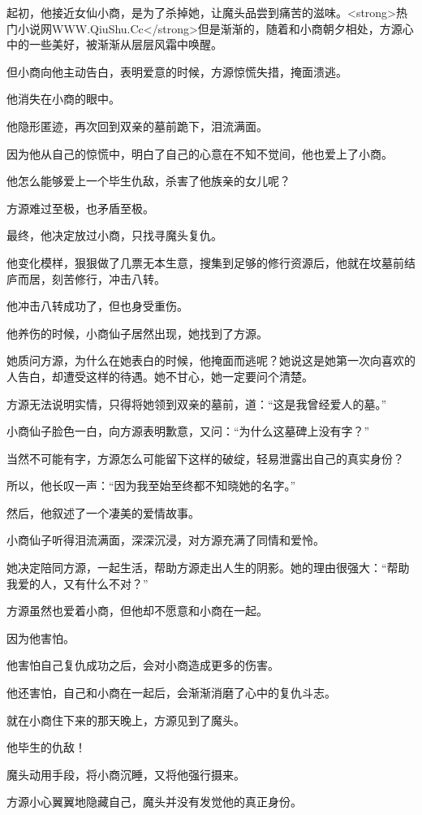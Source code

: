 \begin{this_body}
起初，他接近女仙小商，是为了杀掉她，让魔头品尝到痛苦的滋味。<strong>热门小说网WWW.QiuShu.Cc</strong>但是渐渐的，随着和小商朝夕相处，方源心中的一些美好，被渐渐从层层风霜中唤醒。

但小商向他主动告白，表明爱意的时候，方源惊慌失措，掩面溃逃。

他消失在小商的眼中。

他隐形匿迹，再次回到双亲的墓前跪下，泪流满面。

因为他从自己的惊慌中，明白了自己的心意在不知不觉间，他也爱上了小商。

他怎么能够爱上一个毕生仇敌，杀害了他族亲的女儿呢？

方源难过至极，也矛盾至极。

最终，他决定放过小商，只找寻魔头复仇。

他变化模样，狠狠做了几票无本生意，搜集到足够的修行资源后，他就在坟墓前结庐而居，刻苦修行，冲击八转。

他冲击八转成功了，但也身受重伤。

他养伤的时候，小商仙子居然出现，她找到了方源。

她质问方源，为什么在她表白的时候，他掩面而逃呢？她说这是她第一次向喜欢的人告白，却遭受这样的待遇。她不甘心，她一定要问个清楚。

方源无法说明实情，只得将她领到双亲的墓前，道：“这是我曾经爱人的墓。”

小商仙子脸色一白，向方源表明歉意，又问：“为什么这墓碑上没有字？”

当然不可能有字，方源怎么可能留下这样的破绽，轻易泄露出自己的真实身份？

所以，他长叹一声：“因为我至始至终都不知晓她的名字。”

然后，他叙述了一个凄美的爱情故事。

小商仙子听得泪流满面，深深沉浸，对方源充满了同情和爱怜。

她决定陪同方源，一起生活，帮助方源走出人生的阴影。她的理由很强大：“帮助我爱的人，又有什么不对？”

方源虽然也爱着小商，但他却不愿意和小商在一起。

因为他害怕。

他害怕自己复仇成功之后，会对小商造成更多的伤害。

他还害怕，自己和小商在一起后，会渐渐消磨了心中的复仇斗志。

就在小商住下来的那天晚上，方源见到了魔头。

他毕生的仇敌！

魔头动用手段，将小商沉睡，又将他强行摄来。

方源小心翼翼地隐藏自己，魔头并没有发觉他的真正身份。


\end{this_body}
